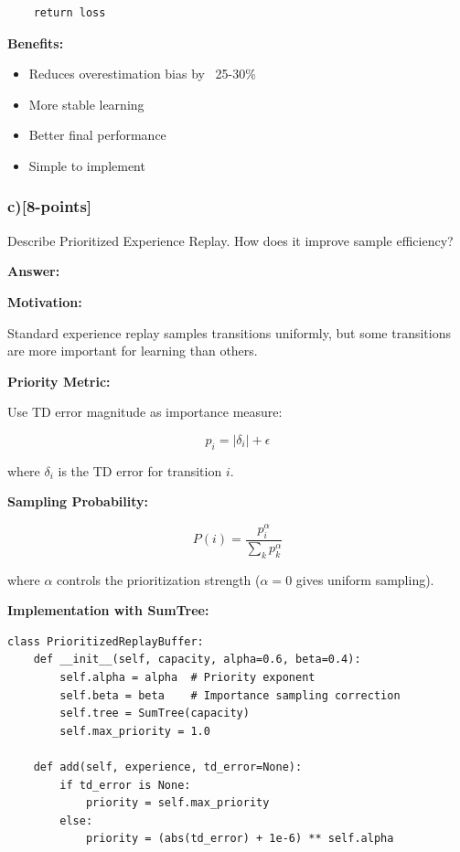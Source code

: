 \documentclass[12pt]{article}
\begin{document}
{{\begin{verbatim}
    return loss
\end{verbatim}

\textbf{Benefits:}
\begin{itemize}
\item Reduces overestimation bias by ~25-30\%
\item More stable learning
\item Better final performance
\item Simple to implement
\end{itemize}

\subsubsection{c)[8-points]} Describe Prioritized Experience Replay. How does it improve sample efficiency?

\textbf{Answer:}

\textbf{Motivation:}

Standard experience replay samples transitions uniformly, but some transitions are more important for learning than others.

\textbf{Priority Metric:}

Use TD error magnitude as importance measure:

\begin{equation}
p_i = |\delta_i| + \epsilon
\end{equation}

where $\delta_i$ is the TD error for transition $i$.

\textbf{Sampling Probability:}

\begin{equation}
P(i) = \frac{p_i^\alpha}{\sum_k p_k^\alpha}
\end{equation}

where $\alpha$ controls the prioritization strength ($\alpha = 0$ gives uniform sampling).

\textbf{Implementation with SumTree:}

\begin{verbatim}
class PrioritizedReplayBuffer:
    def __init__(self, capacity, alpha=0.6, beta=0.4):
        self.alpha = alpha  # Priority exponent
        self.beta = beta    # Importance sampling correction
        self.tree = SumTree(capacity)
        self.max_priority = 1.0

    def add(self, experience, td_error=None):
        if td_error is None:
            priority = self.max_priority
        else:
            priority = (abs(td_error) + 1e-6) ** self.alpha
        

\end{verbatim}}}
\end{document}
